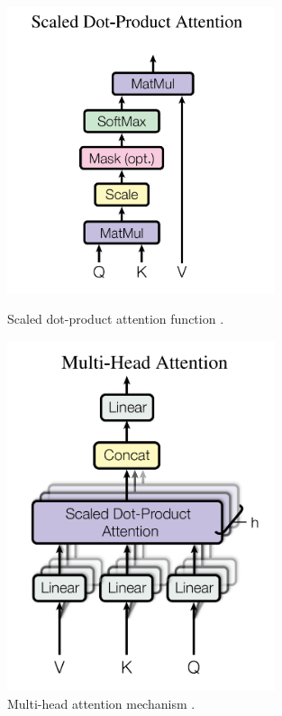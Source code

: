 \documentclass[english, 12pt, a4paper, elec, utf8, a-2b, online]{aaltothesis}
\begin{document}
\begin{figure}[H]
    \centering
    \begin{minipage}{.5\textwidth}
        \centering
        \includegraphics[width=0.7\textwidth]{images/attention_qkv.png}
        \caption{Scaled dot-product attention function \cite{Vaswani2017}.}
        \label{fig:attention_qkv}
    \end{minipage}%
    \begin{minipage}{.5\textwidth}
        \centering
        \includegraphics[width=0.7\textwidth]{images/multihead_attention.png}
        \caption{Multi-head attention mechanism \cite{Vaswani2017}.}
        \label{fig:multihead_attention}
    \end{minipage}
\end{figure}
\end{document}
